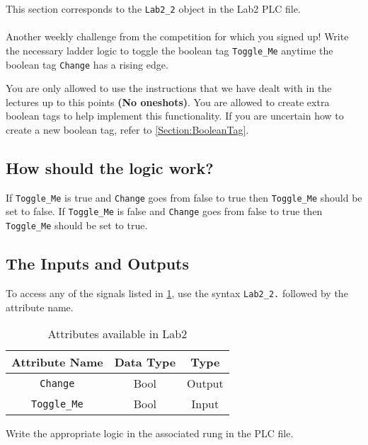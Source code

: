 This section corresponds to the \verb|Lab2_2| object in the Lab2 PLC file.
\\ 
\\
Another weekly challenge from the competition for which you signed up! Write the necessary ladder logic to toggle the boolean tag \verb|Toggle_Me| anytime the boolean tag \verb|Change| has a rising edge.

You are only allowed to use the instructions that we have dealt with in the lectures up to this points \textbf{(No oneshots)}. You are allowed to create extra boolean tags to help implement this functionality. If you are uncertain how to create a new boolean tag, refer to \sectionautorefname \ref{Section:BooleanTag}.

\subsection{How should the logic work?}

If \verb|Toggle_Me| is true and \verb|Change| goes from false to true then \verb|Toggle_Me| should be set to false. If \verb|Toggle_Me| is false and \verb|Change| goes from false to true then \verb|Toggle_Me| should be set to true.



\subsection{The Inputs and Outputs}

To access any of the signals listed in \tableautorefname \ref{Table:Lab2_2Attributes}, use the syntax \verb|Lab2_2.| followed by the attribute name. 

\begin{table}[h]
\centering
\caption{Attributes available in Lab2}
\label{Table:Lab2_2Attributes}
\begin{tabular}{c c c}
\toprule
Attribute Name & Data Type & Type\\
\midrule
\verb|Change| & Bool & Output \\
\midrule
\verb|Toggle_Me| & Bool & Input\\
\bottomrule
\end{tabular}
\end{table}

Write the appropriate logic in the associated rung in the PLC file.


